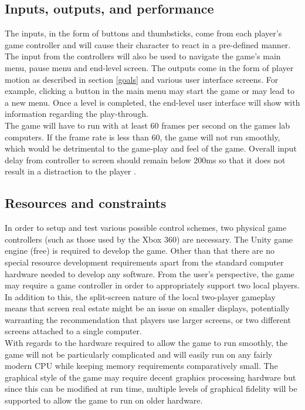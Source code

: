 \documentclass[a4paper,10pt]{article}
\begin{document}
		\subsection{Inputs, outputs, and performance}
		The inputs, in the form of buttons and thumbsticks, come from each player's game controller and will cause their character to react in a pre-defined manner. The input from the controllers will also be used to navigate the game's main menu, pause menu and end-level screen. The outputs come in the form of player motion as described in section \ref{goals} and various user interface screens. For example, clicking a button in the main menu may start the game or may lead to a new menu. Once a level is completed, the end-level user interface will show with information regarding the play-through.\smallskip\\The game will have to run with at least 60 frames per second on the games lab computers. If the frame rate is less than 60, the game will not run smoothly, which would be detrimental to the game-play and feel of the game. Overall input delay from controller to screen should remain below 200ms so that it does not result in a distraction to the player \cite{Leadbetter09}.

		\subsection{Resources and constraints}
		In order to setup and test various possible control schemes, two physical game controllers (such as those used by the Xbox 360) are necessary. The Unity game engine (free) is required to develop the game. Other than that there are no special resource development requirements apart from the standard computer hardware needed to develop any software. From the user's perspective, the game may require a game controller in order to appropriately support two local players. In addition to this, the split-screen nature of the local two-player gameplay means that screen real estate might be an issue on smaller displays, potentially warranting the recommendation that players use larger screens, or two different screens attached to a single computer.
		\smallskip\\
		With regards to the hardware required to allow the game to run smoothly, the game will not be particularly complicated and will easily run on any fairly modern CPU while keeping memory requirements comparatively small. The graphical style of the game may require decent graphics processing hardware but since this can be modified at run time, multiple levels of graphical fidelity will be supported to allow the game to run on older hardware.
\end{document}
